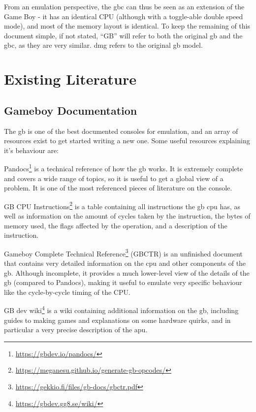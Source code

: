 \documentclass[11pt]{report}
\newcommand{\ftnt}[1]{\footnote{\url{#1}}}
\begin{document}
From an emulation perspective, the \glsdesc{gbc} can thus be seen as an extension of the Game Boy - it has an identical CPU (although with a toggle-able double speed mode), and most of the memory layout is identical. To keep the remaining of this document simple, if not stated, ``GB'' will refer to both the original \glsdesc{gb} and the \glsdesc{gbc}, as they are very similar. \gls{dmg} refers to the original \glsdesc{gb} model.

\section{Existing Literature}

\subsection{Gameboy Documentation}

The \glsdesc{gb} is one of the best documented consoles for emulation, and an array of resources exist to get started writing a new one. Some useful resources explaining it's behaviour are:

\begin{compactitem}
    \item Pandocs\ftnt{https://gbdev.io/pandocs/} is a technical reference of how the \gls{gb} works. It is extremely complete and covers a wide range of topics, so it is useful to get a global view of a problem. It is one of the most referenced pieces of literature on the console.
    \item GB CPU Instructions\ftnt{https://meganesu.github.io/generate-gb-opcodes/} is a table containing all instructions the \gls{gb} \gls{cpu} has, as well as information on the amount of cycles taken by the instruction, the bytes of memory used, the flags affected by the operation, and a description of the instruction.
    \item Gameboy Complete Technical Reference\ftnt{https://gekkio.fi/files/gb-docs/gbctr.pdf} (GBCTR) is an unfinished document that contains very detailed information on the \gls{cpu} and other components of the \gls{gb}. Although incomplete, it provides a much lower-level view of the details of the \gls{gb} (compared to Pandocs), making it useful to emulate very specific behaviour like the cycle-by-cycle timing of the CPU.
    \item GB dev wiki\ftnt{https://gbdev.gg8.se/wiki/} is a wiki containing additional information on the \gls{gb}, including guides to making games and explanations on some hardware quirks, and in particular a very precise description of the \gls{apu}.
\end{compactitem}
\end{document}
